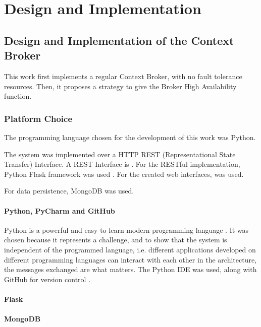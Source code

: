 \chapter{Design and Implementation}
\label{chap:implementation}

\section{Design and Implementation of the Context Broker}
\label{sec:broker}
This work first implements a regular Context Broker, with no fault tolerance resources. Then, it proposes a strategy to give the Broker High Availability function.
 
\subsection{Platform Choice}
The programming language chosen for the development of this work was Python. 

The system was implemented over a HTTP REST (Representational State Transfer) Interface. A REST Interface is \cite{fielding2002principled}. For the RESTful implementation, Python Flask framework was used \cite{flask}. For the created web interfaces, \cite{bootstrap} was used.

For data persistence, MongoDB was used.

\subsubsection{Python, PyCharm and GitHub}
Python is a powerful and easy to learn modern programming language \cite{python}. It was chosen because it represents a challenge, and to show that the system is independent of the programmed language, i.e. different applications developed on different programming languages can interact with each other in the architecture, the messages exchanged are what matters. The Python IDE \cite{pycharm} was used, along with GitHub for version control \cite{github}.

\subsubsection{Flask}
\subsubsection{MongoDB}


